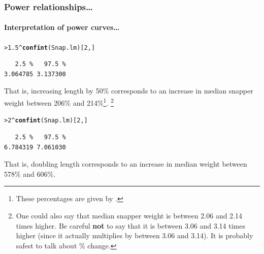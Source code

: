 \documentclass{beamer}\usepackage[]{graphicx}\usepackage[]{xcolor}
\makeatletter
\newcommand{\hlnum}[1]{\textcolor[rgb]{0.686,0.059,0.569}{#1}}%
\newcommand{\hlopt}[1]{\textcolor[rgb]{0,0,0}{#1}}%
\newcommand{\hlstd}[1]{\textcolor[rgb]{0.345,0.345,0.345}{#1}}%
\newcommand{\hlkwd}[1]{\textcolor[rgb]{0.737,0.353,0.396}{\textbf{#1}}}%
\newenvironment{kframe}{%
 \def\at@end@of@kframe{}%
 \ifinner\ifhmode%
  \def\at@end@of@kframe{\end{minipage}}%
  \begin{minipage}{\columnwidth}%
 \fi\fi%
 \def\FrameCommand##1{\hskip\@totalleftmargin \hskip-\fboxsep
 \colorbox{shadecolor}{##1}\hskip-\fboxsep
     \hskip-\linewidth \hskip-\@totalleftmargin \hskip\columnwidth}%
 \MakeFramed {\advance\hsize-\width
   \@totalleftmargin\z@ \linewidth\hsize
   \@setminipage}}%
 {\par\unskip\endMakeFramed%
 \at@end@of@kframe}
\newenvironment{knitrout}{}{} %
\makeatother
\begin{document}
\begin{frame}[fragile]
\frametitle{Power relationships\ldots}
\framesubtitle{Interpretation of power curves\ldots}

\begin{knitrout}\scriptsize
{}\color{fgcolor}\begin{kframe}
\begin{alltt}
\hlstd{> }\hlnum{1.5}\hlopt{^}\hlkwd{confint}\hlstd{(Snap.lm)[}\hlnum{2}\hlstd{,]}
\end{alltt}
\begin{verbatim}
   2.5 %   97.5 % 
3.064785 3.137300 
\end{verbatim}
\end{kframe}
\end{knitrout}
That is, increasing length by 50\% corresponds to an increase in median
snapper weight between 206\% and 214\%\footnote{These percentages are given by .}.
\footnote{One could also say that median snapper weight is between 2.06 and 2.14 times higher. Be careful {\bf not} to say that it is between 3.06 and 3.14 times higher (since it actually multiplies by between 3.06 and 3.14). It is probably safest to talk about \% change.}

\vspace{7mm}
\begin{knitrout}\scriptsize
{}\color{fgcolor}\begin{kframe}
\begin{alltt}
\hlstd{> }\hlnum{2}\hlopt{^}\hlkwd{confint}\hlstd{(Snap.lm)[}\hlnum{2}\hlstd{,]}
\end{alltt}
\begin{verbatim}
   2.5 %   97.5 % 
6.784319 7.061030 
\end{verbatim}
\end{kframe}
\end{knitrout}
That is, doubling length corresponds to an increase in median
weight between 578\% and 606\%.

\end{frame}


\end{document}
